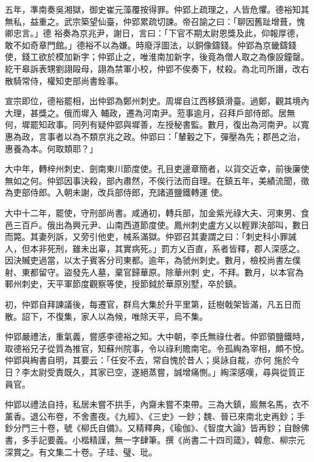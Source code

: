 \begin{pinyinscope}
 五年，準南奏吳湘獄，御史崔元藻覆按得罪。仲郢上疏理之，人皆危懼。德裕知其無私，益重之。武宗築望仙臺，仲郢累疏切諫。帝召諭之曰：「聊因舊趾增葺，愧卿忠言。」德
 裕奏為京兆尹，謝日，言曰：「下官不期太尉恩獎及此，仰報厚德，敢不如奇章門館。」德裕不以為嫌。時廢浮圖法，以銅像鑄錢。仲郢為京畿鑄錢使，錢工欲於模加新字；仲郢止之，唯淮南加新字，後竟為僧人取之為像設鐘罄。紇干皋訴表甥劉詡毆母，詡為禁軍小校，仲郢不俟奏下，杖殺。為北司所譖，改右散騎常侍，權知吏部尚書銓事。



 宣宗即位，德裕罷相，出仲郢為鄭州刺史。周墀自江西移鎮滑臺。過鄭，觀其境內大理，甚獎之。俄而墀入
 輔政，遷為河南尹。蒞事逾月，召拜戶部侍郎。居無何，墀罷知政事。同列有疑仲郢與墀善，左授秘書監。數月，復出為河南尹。以寬惠為政，言事者以為不類京兆之政。仲郢曰：「輦轂之下，彈壓為先；郡邑之治，惠養為本。何取類耶？」



 大中年，轉梓州刺史、劍南東川節度使。孔目吏邊章簡者，以貨交近幸，前後廉使無如之何。仲郢因事決殺，部內肅然，不俟行法而自理。在鎮五年，美績流聞，徵為吏部侍郎。入朝未謝，改兵部侍郎，充諸道鹽鐵轉運
 使。



 大中十二年，罷使，守刑部尚書。咸通初，轉兵部，加金紫光祿大夫、河東男、食邑三百戶。俄出為興元尹、山南西道節度使。鳳州刺史盧方乂以輕罪決部叫，數日而斃。其妻列訴，又旁引他吏，械系滿獄。仲郢召其妻謂之曰：「刺史科小罪誡人，但本非死刑，雖未出辜，其實病死。」罰方乂百直，系者皆釋，郡人深感之。因決贓吏過當，以太子賓客分司東都。逾年，為虢州刺史。數月，檢校尚書左僕射、東都留守。盜發先人墓，棄官歸華原。除華州刺
 史，不拜。數月，以本官為鄆州刺史，天平軍節度觀察等使，授節鉞於華原別墅，卒於鎮。



 初，仲郢自拜諫議後，每遷官，群烏大集於升平里第，廷樹戟架皆滿，凡五日而散。詔下，不復集，家人以為候，唯除天平，烏不集。



 仲郢嚴禮法，重氣義，嘗感李德裕之知。大中朝，李氏無祿仕者。仲郢領鹽鐵時，取德裕兄子從質為推官，知蘇州院事，令以祿利贍南宅。令孤綯為宰相，頗不悅。仲郢與綯書自明，其要云：「任安不去，常自愧於昔人；吳詠自裁，亦何
 施於今日？李太尉受責既久，其家已空，遂絕蒸嘗，誠增痛惻。」綯深感嘆，尋與從質正員官。



 仲郢以禮法自持，私居未嘗不拱手，內齋未嘗不束帶。三為大鎮，廄無名馬，衣不薰香。退公布卷，不舍晝夜。《九經》、《三史》一鈔；魏、晉已來南北史再鈔；手鈔分門三十卷，號《柳氏自備》。又精釋典，《瑜伽》、《智度大論》皆再鈔；自餘佛書，多手記要義。小楷精謹，無一字肆筆。撰《尚書二十四司箴》，韓愈、柳宗元深賞之。有文集二十卷。子珪、璧、玭。




\end{pinyinscope}

